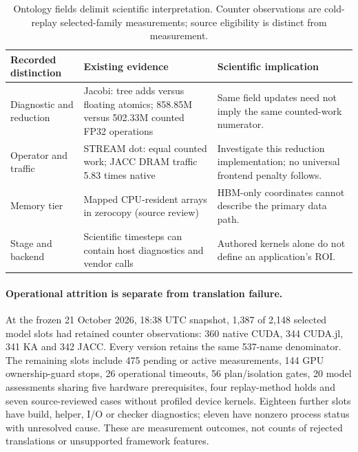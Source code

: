 \begin{table}[t]\centering\small\setlength{\tabcolsep}{3pt}
\caption{Ontology fields delimit scientific interpretation. Counter observations are cold-replay selected-family measurements; source eligibility is distinct from measurement.}
\label{tab:v100-ontology-interpretation}
\begin{tabular}{p{}p{}p{}}
\hline
Recorded distinction & Existing evidence & Scientific implication\\\hline
Diagnostic and reduction & Jacobi: tree adds versus floating atomics; 858.85M versus 502.33M counted FP32 operations & Same field updates need not imply the same counted-work numerator.\\
Operator and traffic & STREAM dot: equal counted work; JACC DRAM traffic 5.83 times native & Investigate this reduction implementation; no universal frontend penalty follows.\\
Memory tier & Mapped CPU-resident arrays in zerocopy (source review) & HBM-only coordinates cannot describe the primary data path.\\
Stage and backend & Scientific timesteps can contain host diagnostics and vendor calls & Authored kernels alone do not define an application's ROI.\\\hline
\end{tabular}
\end{table}

\paragraph{Operational attrition is separate from translation failure.}
At the frozen 21 October 2026, 18:38 UTC snapshot, 1,387 of 2,148 selected model slots had retained counter observations: 360 native CUDA, 344 CUDA.jl, 341 KA and 342 JACC. Every version retains the same 537-name denominator. The remaining slots include 475 pending or active measurements, 144 GPU ownership-guard stops, 26 operational timeouts, 56 plan/isolation gates, 20 model assessments sharing five hardware prerequisites, four replay-method holds and seven source-reviewed cases without profiled device kernels. Eighteen further slots have build, helper, I/O or checker diagnostics; eleven have nonzero process status with unresolved cause. These are measurement outcomes, not counts of rejected translations or unsupported framework features.

